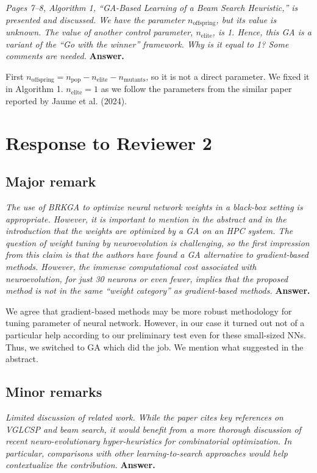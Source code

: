 \documentclass[11pt,a4paper]{article}
\renewenvironment{leftbar}{%
  \def\FrameCommand{\textcolor{reviewbar}{\vrule width 3pt}\hspace{10pt}}%
  \MakeFramed{\advance\hsize-\width\FrameRestore}%
}{\endMakeFramed}
\newcommand{\reviewcomment}[1]{%
\begin{leftbar}
\textit{#1}
\end{leftbar} \textbf{Answer.} 
}
\begin{document}
\reviewcomment{Pages 7--8, Algorithm 1, ``GA-Based Learning of a Beam Search Heuristic,'' is presented and discussed. We have the parameter $n_{\mathrm{offspring}}$, but its value is unknown. The value of another control parameter, $n_{\mathrm{elite}}$, is 1. Hence, this GA is a variant of the ``Go with the winner'' framework. Why is it equal to 1? Some comments are needed.}

First $n_{\mathrm{offspring}}= n_{\mathrm{pop}}- n_{\mathrm{elite}} - n_{\mathrm{mutants}}$, so it is not a direct parameter. We fixed it in Algorithm 1. 
$n_{\mathrm{elite}}=1$ as we follow the parameters from the similar paper reported by Jaume et al. (2024). 


\section*{Response to Reviewer 2}

\subsection*{Major remark}

\reviewcomment{The use of BRKGA to optimize neural network weights in a black-box setting is appropriate. However, it is important to mention in the abstract and in the introduction that the weights are optimized by a GA on an HPC system. The question of weight tuning by neuroevolution is challenging, so the first impression from this claim is that the authors have found a GA alternative to gradient-based methods. However, the immense computational cost associated with neuroevolution, for just 30 neurons or even fewer, implies that the proposed method is not in the same ``weight category'' as gradient-based methods.}

We agree that gradient-based methods may be more robust methodology for tuning parameter of neural network. However, in our case it turned out not of a particular help according to our preliminary test even for these small-sized NNs. Thus, we switched to GA which did the job. We mention what suggested in the abstract. 

\subsection*{Minor remarks}

\reviewcomment{Limited discussion of related work. While the paper cites key references on VGLCSP and beam search, it would benefit from a more thorough discussion of recent neuro-evolutionary hyper-heuristics for combinatorial optimization. In particular, comparisons with other learning-to-search approaches would help contextualize the contribution.}
\end{document}
